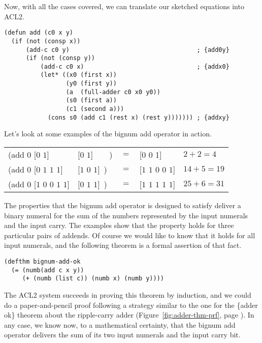 Now, with all the cases covered, we can translate our sketched equations
into ACL2.

\label{bignum-add-defun}
\begin{Verbatim}
(defun add (c0 x y)
  (if (not (consp x))
      (add-c c0 y)                                   ; {add0y}
      (if (not (consp y))
          (add-c c0 x)                               ; {addx0}
          (let* ((x0 (first x))
                 (y0 (first y))
                 (a  (full-adder c0 x0 y0))
                 (s0 (first a))
                 (c1 (second a)))
            (cons s0 (add c1 (rest x) (rest y))))))) ; {addxy}
\end{Verbatim}

Let's look at some examples of the bignum add operator in action.
\begin{center}
\begin{tabular}{lllll}
(add $0$ [$0$ $1$]             &[$0$ $1$]~~~~)  &$=$ &[$0$ $0$ 1]           & $2 + 2 = 4$   \\
(add $0$ [$0$ $1$ $1$ $1$]     &[$1$ $0$ $1$]~) &$=$ &[$1$ $1$ $0$ $0$ $1$] & $14 + 5 = 19$ \\
(add $0$ [$1$ $0$ $0$ $1$ $1$] &[$0$ $1$ $1$]~) &$=$ &[$1$ $1$ $1$ $1$ $1$] & $25 + 6 = 31$ \\
\end{tabular}
\end{center}

The properties that the bignum add operator is designed to satisfy
deliver a binary numeral for the sum of
the numbers represented by the input numerals and the input carry.
The examples show that the property holds for three
particular pairs of addends.
Of course we would like to know that it
holds for all input numerals, and
the following theorem is a formal assertion of that fact.

\label{bignum-adder-thm}
\begin{Verbatim}
(defthm bignum-add-ok
  (= (numb(add c x y))
     (+ (numb (list c)) (numb x) (numb y))))
\end{Verbatim}

The ACL2 system succeeds in proving this theorem by induction,
and we could do a paper-and-pencil proof following a strategy
similar to the one for the \{adder ok\} theorem about the ripple-carry adder
(Figure~\ref{fig:adder-thm-prf}, page \pageref{fig:adder-thm-prf}).
In any case, we know now, to a mathematical certainty,
that the bignum add operator delivers 
the sum of its two input numerals and the input carry bit.


